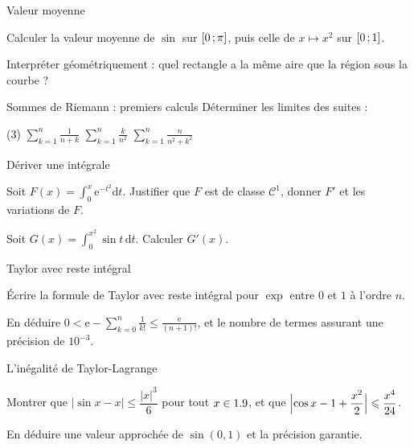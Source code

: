 \begin{exercice}[1]{Valeur moyenne}
\begin{questions}
  \item Calculer la valeur moyenne de $\sin$ sur $\mathopen{[}0\,{;}\,\pi\mathclose{]}$, puis
    celle de $x\mapsto x^{2}$ sur $\mathopen{[}0\,{;}\,1\mathclose{]}$.
  \item Interpréter géométriquement : quel rectangle a la même aire que la
    région sous la courbe ?
\end{questions}
\end{exercice}

\begin{exercice}[1]{Sommes de Riemann : premiers calculs}
Déterminer les limites des suites :
\begin{tasks}(3)
  \task $\displaystyle\sum_{k=1}^{n}\frac{1}{n+k}$
  \task $\displaystyle\sum_{k=1}^{n}\frac{k}{n^{2}}$
  \task $\displaystyle\sum_{k=1}^{n}\frac{n}{n^{2}+k^{2}}$
\end{tasks}
\end{exercice}

\begin{exercice}[1]{Dériver une intégrale}
\begin{questions}
  \item Soit $F(x)=\displaystyle\int_{0}^{x}\mathrm{e}^{-t^{2}}\mathrm{d}t$.
    Justifier que $F$ est de classe $\mathcal{C}^{1}$, donner $F'$ et les
    variations de $F$.
  \item Soit $G(x)=\displaystyle\int_{0}^{x^{2}}\sin t\,\mathrm{d}t$.
    Calculer $G'(x)$.
\end{questions}
\end{exercice}

\begin{exercice}[1]{Taylor avec reste intégral}
\begin{questions}
  \item Écrire la formule de Taylor avec reste intégral pour $\exp$ entre
    $0$ et $1$ à l'ordre $n$.
  \item En déduire
    $0<\mathrm{e}-\displaystyle\sum_{k=0}^{n}\frac{1}{k!}
    \leqslant\frac{\mathrm{e}}{(n+1)!}$, et le nombre de termes assurant
    une précision de $10^{-3}$.
\end{questions}
\end{exercice}

\begin{exercice}[1]{L'inégalité de Taylor-Lagrange}
\begin{questions}
  \item Montrer que $|\sin x-x|\leqslant\dfrac{|x|^{3}}{6}$ pour tout
    $x\in1.9$, et que
    $\Bigl|\cos x-1+\dfrac{x^{2}}{2}\Bigr|\leqslant\dfrac{x^{4}}{24}$.
  \item En déduire une valeur approchée de $\sin(0{,}1)$ et la précision
    garantie.
\end{questions}
\end{exercice}

